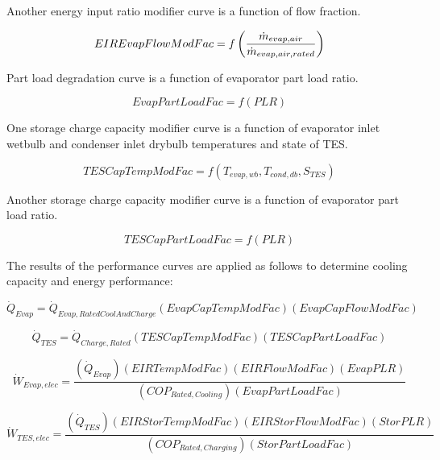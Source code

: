 Another energy input ratio modifier curve is a function of flow fraction.

\begin{equation}
EIREvapFlowModFac = f\left(\frac{\dot{m}_{evap,air}}{\dot{m}_{evap,air,rated}}\right)
\end{equation}

Part load degradation curve is a function of evaporator part load ratio.

\begin{equation}
EvapPartLoadFac = f\left( {PLR} \right)
\end{equation}

One storage charge capacity modifier curve is a function of evaporator inlet wetbulb and condenser inlet drybulb temperatures and state of TES.

\begin{equation}
TESCapTempModFac = f\left( {{T_{evap,wb}},{T_{cond,db}},{S_{TES}}} \right)
\end{equation}

Another storage charge capacity modifier curve is a function of evaporator part load ratio.

\begin{equation}
TESCapPartLoadFac = f\left( {PLR} \right)
\end{equation}

The results of the performance curves are applied as follows to determine cooling capacity and energy performance:

\begin{equation}
{\dot Q_{Evap}} = {\dot Q_{Evap,RatedCoolAndCharge}}\left( {EvapCapTempModFac} \right)\left( {EvapCapFlowModFac} \right)
\end{equation}

\begin{equation}
{\dot Q_{TES}} = {\dot Q_{Charge,Rated}}\left( {TESCapTempModFac} \right)\left( {TESCapPartLoadFac} \right)
\end{equation}

\begin{equation}
{\dot W_{Evap,elec}} = \frac{{\left( {{{\dot Q}_{Evap}}} \right)\left( {EIRTempModFac} \right)\left( {EIRFlowModFac} \right)\left( {EvapPLR} \right)}}{{\left( {CO{P_{Rated,Cooling}}} \right)\left( {EvapPartLoadFac} \right)}}
\end{equation}

\begin{equation}
{\dot W_{TES,elec}} = \frac{{\left( {{{\dot Q}_{TES}}} \right)\left( {EIRStorTempModFac} \right)\left( {EIRStorFlowModFac} \right)\left( {StorPLR} \right)}}{{\left( {CO{P_{Rated,Charging}}} \right)\left( {StorPartLoadFac} \right)}}
\end{equation}

